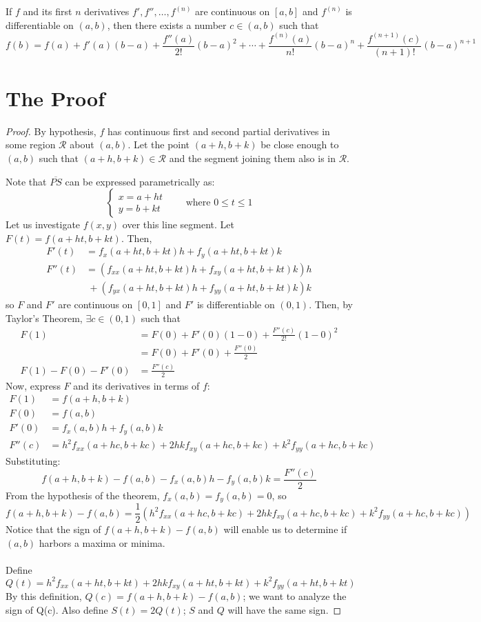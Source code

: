 \documentclass[12pt]{article}
\begin{document}
\begin{theorem}
If $f$ and its first $n$ derivatives $f',f'',\dots,f^{(n)}$ are continuous on $[a,b]$ and $f^{(n)}$ is differentiable on $(a,b)$, then there exists a number $c \in (a,b)$ such that \[ f(b) = f(a) + f'(a)(b-a) + \frac{f''(a)}{2!}(b-a)^2 + \cdots + \frac{f^{(n)}(a)}{n!}(b-a)^n + \frac{f^{(n+1)}(c)}{(n+1)!}(b-a)^{n+1} \]
\end{theorem}

\section{The Proof}
\begin{proof}
By hypothesis, $f$ has continuous first and second partial derivatives in some region $\mathcal{R}$ about $(a,b)$. Let the point $(a+h,b+k)$ be close enough to $(a,b)$ such that $(a+h,b+k) \in \mathcal{R}$ and the segment joining them also is in $\mathcal{R}$.

Note that $\overline{PS}$ can be expressed parametrically as: \[ \begin{cases}x = a+ht \\ y=b+kt \end{cases} \qquad \text{where } 0 \le t \le 1 \]
Let us investigate $f(x,y)$ over this line segment. Let $F(t) = f(a+ht,b+kt)$. Then, 
\[
\begin{aligned}
F'(t) &= f_x(a+ht,b+kt)h + f_y(a+ht,b+kt)k \\
F''(t) &= (f_{xx}(a+ht,b+kt)h + f_{xy}(a+ht,b+kt)k)h \\ &\ + (f_{yx}(a+ht,b+kt)h + f_{yy}(a+ht,b+kt)k)k
\end{aligned}
\]
so $F$ and $F'$ are continuous on $[0,1]$ and $F'$ is differentiable on $(0,1)$. Then, by Taylor's Theorem, $\exists c \in (0,1)$ such that 
\[ 
\begin{aligned}
F(1) &= F(0) + F'(0)(1-0) + \frac{F''(c)}{2!}(1-0)^2 \\
&= F(0) + F'(0) + \frac{F''(0)}{2} \\
F(1) - F(0) - F'(0) &= \frac{F''(c)}{2}
\end{aligned}
\]
Now, express $F$ and its derivatives in terms of $f$:
\[
\begin{aligned}
F(1) &= f(a+h,b+k) \\
F(0) &= f(a,b) \\
F'(0) &= f_x(a,b)h + f_y(a,b)k \\
F''(c) &= h^2f_{xx}(a+hc,b+kc) + 2hkf_{xy}(a+hc,b+kc) + k^2f_{yy}(a+hc,b+kc) 
\end{aligned}
\]
Substituting:
\[ f(a+h,b+k) - f(a,b) - f_x(a,b)h - f_y(a,b)k = \frac{F''(c)}{2}\]
From the hypothesis of the theorem, $f_x(a,b) = f_y(a,b) = 0$, so \[ f(a+h,b+k) - f(a,b) = \frac{1}{2}(h^2f_{xx}(a+hc,b+kc) + 2hkf_{xy}(a+hc,b+kc) + k^2f_{yy}(a+hc,b+kc))  \] Notice that the sign of $f(a+h,b+k) - f(a,b)$ will enable us to determine if $(a,b)$ harbors a maxima or minima. \\ \\
Define \[ Q(t) = h^2f_{xx}(a+ht,b+kt) + 2hkf_{xy}(a+ht,b+kt) + k^2f_{yy}(a+ht,b+kt) \] By this definition, $Q(c) = f(a+h,b+k) - f(a,b)$; we want to analyze the sign of Q(c). Also define $S(t) = 2Q(t)$; $S$ and $Q$ will have the same sign.


\end{proof}
\end{document}
